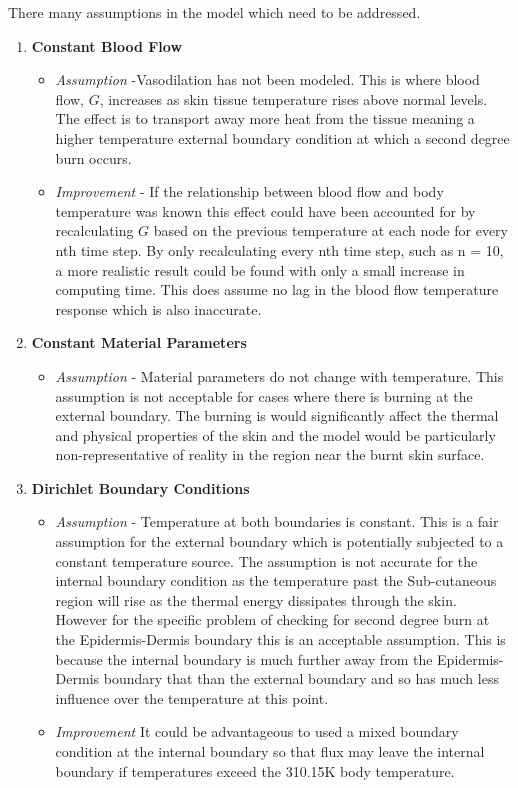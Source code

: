 \documentclass[11pt]{article}
\begin{document}
There many assumptions in the model which need to be addressed. 

\begin{enumerate}
\item{\textbf{Constant Blood Flow}}
\begin{itemize}
\item{\textit{Assumption} -Vasodilation has not been modeled. This is where blood flow, $G$, increases as skin tissue temperature rises above normal levels. The effect is to transport away more heat from the tissue meaning a higher temperature external boundary condition at which a second degree burn occurs.}
\item{\textit{Improvement} - If the relationship between blood flow and body temperature was known this effect could have been accounted for by recalculating $G$ based on the previous temperature at each node for every nth time step. By only recalculating every nth time step, such as n = 10,  a more realistic result could be found with only a small increase in computing time. This does assume no lag in the blood flow temperature response which is also inaccurate.}
\end{itemize}
\item{\textbf{Constant Material Parameters}}
\begin{itemize}
\item{\textit{Assumption} - Material parameters do not change with temperature. This assumption is not acceptable for cases where there is burning at the external boundary. The burning is would significantly affect the thermal and physical properties of the skin and the model would be particularly non-representative of reality in the region near the burnt skin surface.  }
\end{itemize}
\item{\textbf{Dirichlet Boundary Conditions}}
\begin{itemize}
\item{\textit{Assumption} - Temperature at both boundaries is constant. This is a fair assumption for the external boundary which is potentially subjected to a constant temperature source. The assumption is not accurate for the internal boundary condition as the temperature past the Sub-cutaneous region will rise as the thermal energy dissipates through the skin. However for the specific problem of checking for second degree burn at the Epidermis-Dermis boundary this is an acceptable assumption. This is because the internal boundary is much further away from the Epidermis-Dermis boundary that than the external boundary and so has much less influence over the temperature at this point. }
\item{\textit{Improvement} It could be advantageous to used a mixed boundary condition at the internal boundary so that flux may leave the internal boundary if temperatures exceed the 310.15K body temperature. }
\end{itemize}
\end{enumerate}
\end{document}
